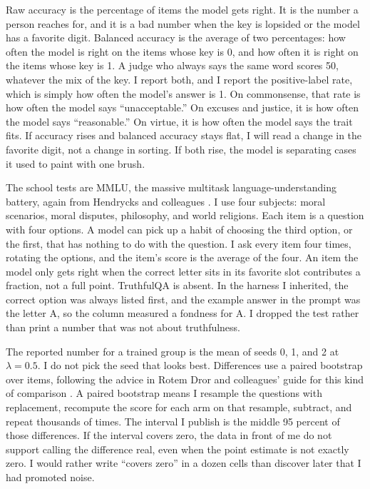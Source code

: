 \documentclass[11pt]{article}
\begin{document}
Raw accuracy is the percentage of items the model gets right. It is the number a person reaches for, and it is a bad number when the key is lopsided or the model has a favorite digit. Balanced accuracy is the average of two percentages: how often the model is right on the items whose key is 0, and how often it is right on the items whose key is 1. A judge who always says the same word scores 50, whatever the mix of the key. I report both, and I report the positive-label rate, which is simply how often the model's answer is 1. On commonsense, that rate is how often the model says ``unacceptable.'' On excuses and justice, it is how often the model says ``reasonable.'' On virtue, it is how often the model says the trait fits. If accuracy rises and balanced accuracy stays flat, I will read a change in the favorite digit, not a change in sorting. If both rise, the model is separating cases it used to paint with one brush.

The school tests are MMLU, the massive multitask language-understanding battery, again from Hendrycks and colleagues \citep{hendrycks2021mmlu}. I use four subjects: moral scenarios, moral disputes, philosophy, and world religions. Each item is a question with four options. A model can pick up a habit of choosing the third option, or the first, that has nothing to do with the question. I ask every item four times, rotating the options, and the item's score is the average of the four. An item the model only gets right when the correct letter sits in its favorite slot contributes a fraction, not a full point. TruthfulQA is absent. In the harness I inherited, the correct option was always listed first, and the example answer in the prompt was the letter A, so the column measured a fondness for A. I dropped the test rather than print a number that was not about truthfulness.

The reported number for a trained group is the mean of seeds 0, 1, and 2 at $\lambda = 0.5$. I do not pick the seed that looks best. Differences use a paired bootstrap over items, following the advice in Rotem Dror and colleagues' guide for this kind of comparison \citep{dror2018}. A paired bootstrap means I resample the questions with replacement, recompute the score for each arm on that resample, subtract, and repeat thousands of times. The interval I publish is the middle 95 percent of those differences. If the interval covers zero, the data in front of me do not support calling the difference real, even when the point estimate is not exactly zero. I would rather write ``covers zero'' in a dozen cells than discover later that I had promoted noise.
\end{document}
